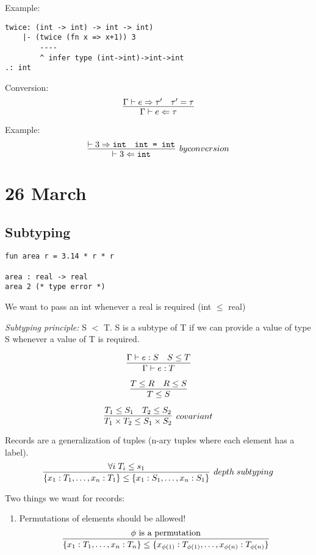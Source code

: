 \documentclass[11pt]{article}
\begin{document}
Example:
\begin{verbatim}
twice: (int -> int) -> int -> int)
    |- (twice (fn x => x+1)) 3
        ----
        ^ infer type (int->int)->int->int
.: int
\end{verbatim}

Conversion:
\[
    \infer{\Gamma \vdash e \Leftarrow \tau}{
        \Gamma \vdash e \Rightarrow \tau^{\prime}
        &
        \tau^{\prime} = \tau
    }
\]

Example:
\[
    \infer[by conversion]{\vdash 3 \Leftarrow \verb~int~}{
        \vdash 3 \Rightarrow \verb~int~
        &
        \verb~int = int~
    }
\]

\section{26 March}
\subsection{Subtyping}
\begin{verbatim}
fun area r = 3.14 * r * r

area : real -> real
area 2 (* type error *)
\end{verbatim}

We want to pass an int whenever a real is required (int $\leq$ real)

\emph{Subtyping principle:} S $<$ T. S is a subtype of T if we can provide a value of type S whenever a value of T is required.

\[
    \infer{\Gamma \vdash e : T}{
        \Gamma \vdash e : S
        &
        S \leq T
    }
\]

\[
    \infer{T \leq S}{
        T \leq R
        &
        R \leq S
    }
\]

\[
    \infer[covariant]{T_1 \times T_2 \leq S_1 \times S_2}{
        T_1 \leq S_1
        &
        T_2 \leq S_2
    }
\]

Records are a generalization of tuples (n-ary tuples where each element has a label).
\[
    \infer[depth \; subtyping]{\{x_1 : T_1, \dots, x_n : T_1 \} \leq \{ x_1 : S_1, \dots, x_n : S_1 \} }{
        \forall i \; T_i \leq s_1
    }
\]

Two things we want for records:
\begin{enumerate}
    \item Permutations of elements should be allowed! \\
        \[
            \infer{ \{ x_1 : T_1, \dots, x_n : T_n\} \leq \{ x_{\phi(1)} : T_{\phi(1)}, \dots, x_{\phi(n)} : T_{\phi(n)} \} }{
                \phi \textnormal{ is a permutation}
            }
        \]
        
\end{enumerate}
\end{document}
